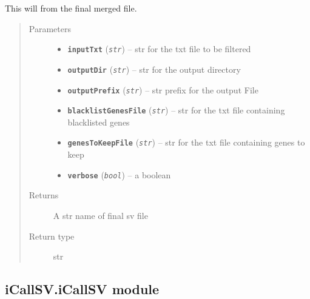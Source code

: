 \documentclass[letterpaper,10pt,english]{sphinxmanual}
\begin{document}
\begin{fulllineitems}
\label{iCallSV:iCallSV.filterAnnotatedSV.run}
This will  from the final merged file.
\begin{quote}\begin{description}
\item[{Parameters}] \leavevmode\begin{itemize}
\item {} 
\textbf{\texttt{inputTxt}} (\emph{\texttt{str}}) -- str for the txt file to be filtered

\item {} 
\textbf{\texttt{outputDir}} (\emph{\texttt{str}}) -- str for the output directory

\item {} 
\textbf{\texttt{outputPrefix}} (\emph{\texttt{str}}) -- str prefix for the output File

\item {} 
\textbf{\texttt{blacklistGenesFile}} (\emph{\texttt{str}}) -- str for the txt file containing blacklisted genes

\item {} 
\textbf{\texttt{genesToKeepFile}} (\emph{\texttt{str}}) -- str for the txt file containing genes to keep

\item {} 
\textbf{\texttt{verbose}} (\emph{\texttt{bool}}) -- a boolean

\end{itemize}

\item[{Returns}] \leavevmode
A str name of final sv file

\item[{Return type}] \leavevmode
str

\end{description}\end{quote}

\end{fulllineitems}



\subsection{iCallSV.iCallSV module}
\label{iCallSV:icallsv-icallsv-module}\label{iCallSV:module-iCallSV.iCallSV}
\end{document}
